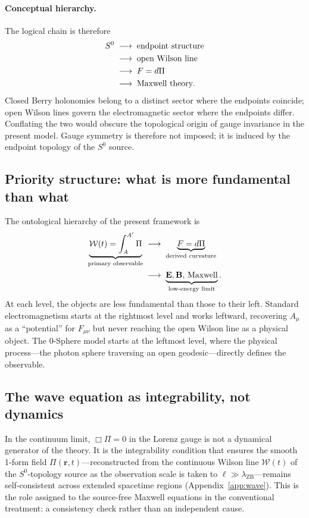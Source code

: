 \documentclass[%
 reprint, amsmath,amssymb, aps, prb, ]{revtex4-2}
\numberwithin{equation}{section}
\newcommand{\WL}{\mathcal{W}}
\begin{document}
\paragraph{Conceptual hierarchy.}
The logical chain is therefore
\begin{align}
S^0
&\;\longrightarrow\;
\text{endpoint structure}
\notag\\
&\;\longrightarrow\;
\text{open Wilson line}
\notag\\
&\;\longrightarrow\;
F=d\Pi
\notag\\
&\;\longrightarrow\;
\text{Maxwell theory}.
\label{eq:chain}
\end{align}
Closed Berry holonomies belong to a distinct sector where the endpoints coincide; open Wilson lines govern the electromagnetic sector where the endpoints differ. Conflating the two would obscure the topological origin of gauge invariance in the present model. Gauge symmetry is therefore not imposed; it is induced by the endpoint topology of the $S^0$ source.

\subsection{Priority structure: what is more fundamental than what}

The ontological hierarchy of the present framework is
\begin{align}
\underbrace{\WL(t) = \int_A^{A'}\Pi}_{\text{primary observable}}
&\;\longrightarrow\;
\underbrace{F = d\Pi}_{\text{derived curvature}}
\notag\\
&\;\longrightarrow\;
\underbrace{\mathbf{E},\mathbf{B},\,\text{Maxwell}}_{\text{low-energy limit}}.
\label{eq:hierarchy}
\end{align}
At each level, the objects are less fundamental than those to their left. Standard electromagnetism starts at the rightmost level and works leftward, recovering $A_\mu$ as a ``potential'' for $F_{\mu\nu}$ but never reaching the open Wilson line as a physical object. The 0-Sphere model starts at the leftmost level, where the physical process---the photon sphere traversing an open geodesic---directly defines the observable.

\subsection{The wave equation as integrability, not dynamics}

In the continuum limit, $\Box\Pi = 0$ in the Lorenz gauge is not a dynamical generator of the theory. It is the integrability condition that ensures the smooth 1-form field $\Pi(\mathbf{r},t)$---reconstructed from the continuous Wilson line $\WL(t)$ of the $S^0$-topology source as the observation scale is taken to $\ell\gg\lambda_{\text{ZB}}$---remains self-consistent across extended spacetime regions (Appendix~\ref{app:wave}). This is the role assigned to the source-free Maxwell equations in the conventional treatment: a consistency check rather than an independent cause.
\end{document}
